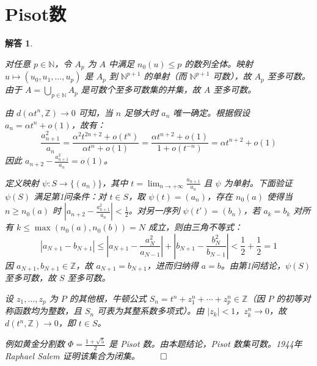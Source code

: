\documentclass[12pt,UTF8,fontset=none]{ctexbook}
\theoremstyle{exercisestyle}
\theoremstyle{solutionstyle}
\newtheorem*{solution*}{解答}
\newenvironment{solution}
  {\begin{solution*}}
  {\hfill\ensuremath{\qed}\end{solution*}}
\begin{document}
\section{Pisot数}
\begin{solution}
  \begin{subquestions}
    \item 对任意 $p \in \mathbb{N}$，令 $A_p$ 为 $A$ 中满足 $n_0(u) \leq p$ 的数列全体。映射 $u \mapsto (u_0, u_1, \ldots, u_p)$ 是 $A_p$ 到 $\mathbb{N}^{p+1}$ 的单射（而 $\mathbb{N}^{p+1}$ 可数），故 $A_p$ 至多可数。由于 $A = \bigcup_{p \in \mathbb{N}} A_p$ 是可数个至多可数集的并集，故 $A$ 至多可数。
    
    \item 由 $d(\alpha t^n, \mathbb{Z}) \to 0$ 可知，当 $n$ 足够大时 $a_n$ 唯一确定。根据假设 $a_n = \alpha t^n + o(1)$，故有：
    $$
    \frac{a_{n+1}^2}{a_n} = \frac{\alpha^2 t^{2n+2} + o(t^n)}{\alpha t^n + o(1)} = \frac{\alpha t^{n+2} + o(1)}{1 + o(t^{-n})} = \alpha t^{n+2} + o(1)
    $$
    因此 $a_{n+2} - \frac{a_{n+1}^2}{a_n} = o(1)$。

    定义映射 $\psi: S \to \{(a_n)\}$，其中 $t = \lim_{n \to +\infty} \frac{a_{n+1}}{a_n}$ 且 $\psi$ 为单射。下面验证 $\psi(S)$ 满足第1问条件：对 $t \in S$，取 $\psi(t) = (a_n)$，存在 $n_0(a)$ 使得当 $n \geq n_0(a)$ 时 $\left| a_{n+2} - \frac{a_{n+1}^2}{a_n} \right| < \frac{1}{2}$。对另一序列 $\psi(t') = (b_n)$，若 $a_k = b_k$ 对所有 $k \leq \max(n_0(a), n_0(b)) = N$ 成立，则由三角不等式：
    $$
    |a_{N+1} - b_{N+1}| \leq \left|a_{N+1} - \frac{a_N^2}{a_{N-1}}\right| + \left|b_{N+1} - \frac{b_N^2}{b_{N-1}}\right| < \frac{1}{2} + \frac{1}{2} = 1
    $$
    因 $a_{N+1}, b_{N+1} \in \mathbb{Z}$，故 $a_{N+1} = b_{N+1}$，进而归纳得 $a = b$。由第1问结论，$\psi(S)$ 至多可数，故 $S$ 至多可数。

    \item 设 $z_1, \ldots, z_p$ 为 $P$ 的其他根，牛顿公式 $S_n = t^n + z_1^n + \cdots + z_p^n \in \mathbb{Z}$（因 $P$ 的初等对称函数均为整数，且 $S_n$ 可表为其整系数多项式）。由 $|z_k| < 1$，$z_k^n \to 0$，故 $d(t^n, \mathbb{Z}) \to 0$，即 $t \in S$。
  \end{subquestions}
  例如黄金分割数 $\Phi = \frac{1+\sqrt{5}}{2}$ 是 Pisot 数。由本题结论，Pisot 数集可数。1944年 Raphael Salem 证明该集合为闭集。
\end{solution}
\end{document}
